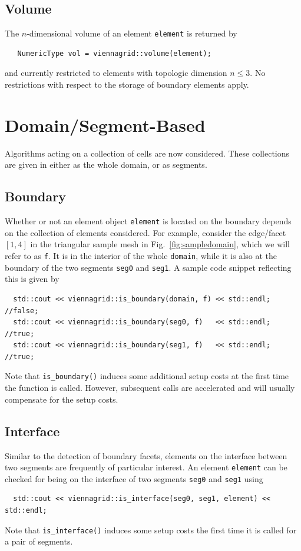   \subsection{Volume}
  The $n$-dimensional volume of an element \lstinline|element| is returned by
  \begin{lstlisting}
   NumericType vol = viennagrid::volume(element);
  \end{lstlisting}
  and currently restricted to elements with topologic dimension $n \leq 3$. No restrictions with respect to the storage of boundary elements apply.


\section{Domain/Segment-Based}
Algorithms acting on a collection of cells are now considered. These collections are given in {\ViennaGrid} either as the whole domain, or as segments.

 \subsection{Boundary}
 Whether or not an element object \lstinline|element| is located on the boundary depends on the collection of elements considered.
 For example, consider the edge/facet $[1,4]$ in the triangular sample mesh in Fig.~\ref{fig:sampledomain}, which we will refer to as \lstinline|f|.
 It is in the interior of the whole \lstinline|domain|, while it is also at the boundary of the two segments \lstinline|seg0| and \lstinline|seg1|.
 A sample code snippet reflecting this is given by
 \begin{lstlisting}
  std::cout << viennagrid::is_boundary(domain, f) << std::endl; //false;
  std::cout << viennagrid::is_boundary(seg0, f)   << std::endl; //true;
  std::cout << viennagrid::is_boundary(seg1, f)   << std::endl; //true;
 \end{lstlisting}
 Note that \lstinline|is_boundary()| induces some additional setup costs at the first time the function is called. However, subsequent calls are accelerated and will usually compensate for the setup costs.

 

 \subsection{Interface}
  Similar to the detection of boundary facets, elements on the interface between two segments are frequently of particular interest. 
  An element \lstinline|element| can be checked for being on the interface of two segments \lstinline|seg0| and \lstinline|seg1| using
 \begin{lstlisting}
  std::cout << viennagrid::is_interface(seg0, seg1, element) << std::endl;
 \end{lstlisting}
 Note that \lstinline|is_interface()| induces some setup costs the first time it is called for a pair of segments.

